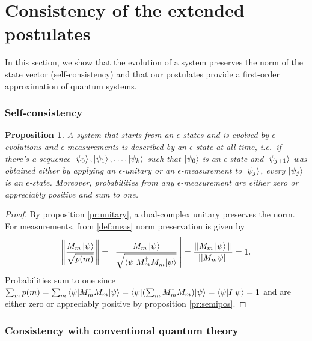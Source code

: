 \documentclass{article}
\newtheorem{proposition}[theorem]{Proposition}
\newcommand{\e}{\epsilon}
\newcommand{\norm}[1]{\left\lVert#1\right\rVert}
\begin{document}
\section{Consistency of the extended postulates}

In this section, we show that the evolution of a system preserves the norm of the state vector (self-consistency) and that our postulates provide a first-order approximation of quantum systems.

\subsubsection*{Self-consistency}

\begin{proposition}\label{pr:consistency}
A system that starts from an $\e$-states and is evolved by $\e$-evolutions and $\e$-measurements is described by an $\e$-state at all time, i.e.\ if there's a sequence $\ket{\psi_0}, \ket{\psi_1}, \dots, \ket{\psi_k}$ such that $\ket{\psi_0}$ is an $\e$-state and $\ket{\psi_{j+1}}$ was obtained either by applying an $\e$-unitary or an $\e$-measurement to $\ket{\psi_j}$, every $\ket{\psi_j}$ is an $\e$-state. Moreover, probabilities from any $\e$-measurement are either zero or appreciably positive and sum to one.
\end{proposition}
\begin{proof}
By proposition \ref{pr:unitary}, a dual-complex unitary preserves the norm. For measurements, from \ref{def:meas} norm preservation is given by
\begin{equation}
\norm{\frac{M_m \ket\psi}{\sqrt{p(m)}}} = \norm{\frac{M_m \ket\psi}{\sqrt{\braket{\psi|M_m^\dagger M_m|\psi}}}} = \frac{||M_m \ket\psi||}{||M_m\psi||} = 1.
\end{equation}
Probabilities sum to one since $\sum_m p(m) = \sum_m \braket{\psi|M_m^\dagger M_m|\psi} = \braket{\psi|(\sum_m M_m^\dagger M_m)|\psi} = \braket{\psi|I|\psi} = 1$ and are either zero or appreciably positive by proposition \ref{pr:semipos}.
\end{proof}

\subsubsection*{Consistency with conventional quantum theory}
\end{document}
